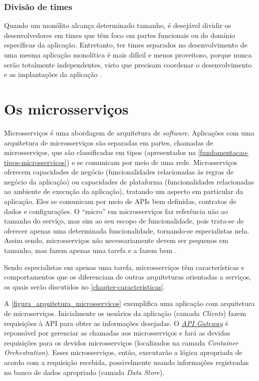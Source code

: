 \subsubsection{Divisão de times}
Quando um monólito alcança determinado tamanho, é desejável dividir os desenvolvedores em times que têm foco em partes funcionais ou do domínio específicas da aplicação. Entretanto, ter times separados no desenvolvimento de uma mesma aplicação monolítica é mais difícil e menos proveitoso, porque nunca serão totalmente independentes, visto que precisam coordenar o desenvolvimento e as implantações da aplicação \cite{microservicesIO_monolithic_architecture}.

\section{Os microsserviços}

Microsserviços é uma abordagem de arquitetura de \emph{software}. Aplicações com uma arquitetura de microsserviços são separadas em partes, chamadas de microsserviços, que são classificadas em tipos (apresentados na \autoref{fundamentacao-tipos-microsservicos}) e se comunicam por meio de uma rede. Microsserviços oferecem capacidades de negócio (funcionalidades relacionadas às regras de negócio da aplicação) ou capacidades de plataforma (funcionalidades relacionadas ao ambiente de execução da aplicação), tratando um aspecto em particular da aplicação. Eles se comunicam por meio de APIs bem definidas, contratos de dados e configurações. O “micro” em microsserviços faz referência não ao tamanho do serviço, mas sim ao seu escopo de funcionalidade, pois trata-se de oferecer apenas uma determinada funcionalidade, tornando-se especialistas nela. Assim sendo, microsserviços não necessariamente devem ser pequenos em tamanho, mas fazem apenas uma tarefa e a fazem bem \cite{Familiar2015,livro-building-microservices}.


Sendo especialistas em apenas uma tarefa, microsserviços têm características e comportamentos que os diferenciam de outras arquiteturas orientadas a serviços, os quais serão discutidos no \autoref{chapter-caracteristicas}.

A \autoref{figura_arquitetura_microsservicos} exemplifica uma aplicação com arquitetura de microserviços. Inicialmente os usuários da aplicação (camada \emph{Clients}) fazem requisições à API para obter as informações desejadas. O \hyperref[boas-praticas-api-gateway]{\emph{API Gateway}} é reponsável por gerenciar as chamadas aos microsserviços e fará as devidas requisições para os devidos microsserviços (localizados na camada \emph{Container Orchestration}). Esses microsserviços, então, executarão a lógica apropriada de acordo com a requisição recebida, possivelmente usando informações registradas no banco de dados apropriado (camada \emph{Data Store}).

